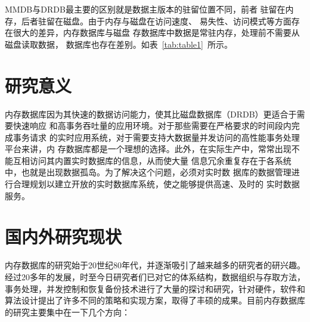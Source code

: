 \documentclass[literaturereview]{zjutreport}
\begin{document}
MMDB与DRDB最主要的区别就是数据主版本的驻留位置不同，前者
驻留在内存，后者驻留在磁盘。由于内存与磁盘在访问速度、
易失性、访问模式等方面存在很大的差异，内存数据库与磁盘
存数据库中数据是常驻内存，处理前不需要从磁盘读取数据， 数据库也存在差别。如表~\ref{tab:table1}~所示。

\begin{table}[htbp]
\caption{MMDB和DRDB的比较}\label{tab:table1}
\vspace{\baselineskip}
\end{table}

\chapter{研究意义}
内存数据库因为其快速的数据访问能力，使其比磁盘数据库（DRDB）更适合于需要快速响应
和高事务吞吐量的应用环境。对于那些需要在严格要求的时间段内完成事务请求
的实时应用系统，对于需要支持大数据量并发访问的高性能事务处理平台来讲，内
存数据库都是一个理想的选择。此外，在实际生产中，常常出现不能互相访问其内置实时数据库的信息，从而使大量
信息冗余重复存在于各系统中，也就是出现数据孤岛。为了解决这个问题，必须对实时数
据库的数据管理进行合理规划以建立开放的实时数据库系统，使之能够提供高速、及时的
实时数据服务。

\chapter{国内外研究现状}
内存数据库的研究始于20世纪80年代，并逐渐吸引了越来越多的研究者的研兴趣。经过20多年的发展，时至今日研究者们已对它的体系结构，数据组织与存取方法，事务处理，并发控制和恢复备份技术进行了大量的探讨和研究，针对硬件，软件和算法设计提出了许多不同的策略和实现方案，取得了丰硕的成果。目前内存数据库的研究主要集中在一下几个方向：
\end{document}
